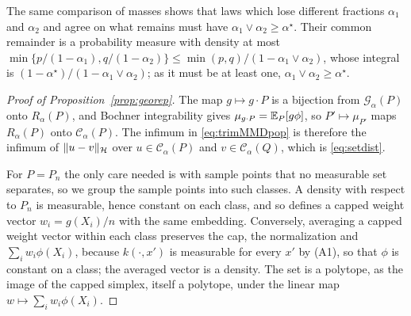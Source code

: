 The same comparison of masses shows that laws which lose different fractions $\alpha_1$ and $\alpha_2$ and agree on what
remains must have $\alpha_1\vee\alpha_2\ge\alpha^\star$. Their common remainder is a probability measure with density
at most $\min\{p/(1-\alpha_1),q/(1-\alpha_2)\}\le\min(p,q)/(1-\alpha_1\vee\alpha_2)$, whose integral is
$(1-\alpha^\star)/(1-\alpha_1\vee\alpha_2)$; as it must be at least one, $\alpha_1\vee\alpha_2\ge\alpha^\star$.

\begin{proof}[Proof of Proposition~\ref{prop:georep}]
The map $g\mapsto g\cdot P$ is a bijection from $\mathcal G_\alpha(P)$ onto $R_\alpha(P)$, and Bochner
integrability gives $\mu_{g\cdot P}=\mathbb{E}_P[g\phi]$, so $P'\mapsto\mu_{P'}$ maps $R_\alpha(P)$ onto
$\mathcal C_\alpha(P)$. The infimum in \eqref{eq:trimMMDpop} is therefore the infimum of $\|u-v\|_{\mathcal{H}}$ over
$u\in\mathcal C_\alpha(P)$ and $v\in\mathcal C_\alpha(Q)$, which is \eqref{eq:setdist}.

For $P=P_n$ the only care needed is with sample points that no measurable set separates, so we group the sample points
into such classes. A density with respect to $P_n$ is measurable, hence constant on each class, and so defines a capped
weight vector $w_i=g(X_i)/n$ with the same embedding. Conversely, averaging a capped weight vector within each class
preserves the cap, the normalization and $\sum_iw_i\phi(X_i)$, because $k(\cdot,x')$ is measurable for every $x'$ by
(A1), so that $\phi$ is constant on a class; the averaged vector is a density. The set is a polytope, as the
image of the capped simplex, itself a polytope, under the linear map $w\mapsto\sum_iw_i\phi(X_i)$.
\end{proof}

